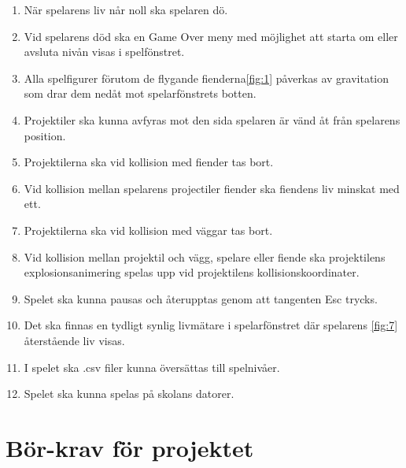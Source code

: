 \documentclass{TDP005mall}
\begin{document}
\begin{enumerate}
\item När spelarens liv når noll ska spelaren dö.
\item Vid spelarens död ska en Game Over meny med möjlighet att starta om eller avsluta nivån visas i spelfönstret.
\item Alla spelfigurer förutom de flygande fienderna\ref{fig:1} påverkas av gravitation som drar dem nedåt mot spelarfönstrets botten.
\item Projektiler ska kunna avfyras mot den sida spelaren är vänd åt från spelarens position.
\item Projektilerna ska vid kollision med fiender tas bort.
\item Vid kollision mellan spelarens projectiler fiender ska fiendens liv minskat med ett.
\item Projektilerna ska vid kollision med väggar tas bort.
\item Vid kollision mellan projektil och vägg, spelare eller fiende ska projektilens explosionsanimering spelas upp vid projektilens kollisionskoordinater.
\item Spelet ska kunna pausas och återupptas genom att tangenten Esc trycks.
\item Det ska finnas en tydligt synlig livmätare i spelarfönstret där spelarens \ref{fig:7} återstående liv visas.
\item I spelet ska .csv filer kunna översättas till spelnivåer.
\item Spelet ska kunna spelas på skolans datorer.
\end{enumerate}

\section{Bör-krav för projektet}
\end{document}
